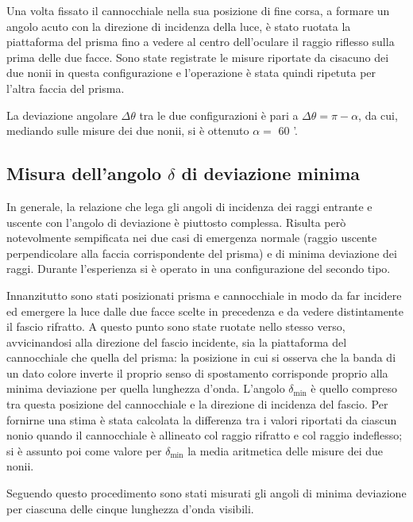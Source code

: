 \documentclass[italian,a4paper]{article}
\begin{document}
Una volta fissato il cannocchiale nella sua posizione di fine corsa, a formare un angolo acuto con la direzione di incidenza della luce, è stato ruotata la piattaforma del prisma fino a vedere al centro dell'oculare il raggio riflesso sulla prima delle due facce. Sono state registrate le misure riportate da cisacuno dei due nonii in questa configurazione e l'operazione è stata quindi ripetuta per l'altra faccia del prisma.

La deviazione angolare $\Delta \theta$ tra le due configurazioni è pari a $\Delta\theta=\pi-\alpha$, da cui, mediando sulle misure dei due nonii, si è ottenuto $\alpha=$ 60 '.
\subsection*{Misura dell'angolo $\delta$ di deviazione minima}
In generale, la relazione che lega gli angoli di incidenza dei raggi entrante e uscente con l'angolo di deviazione è piuttosto complessa. Risulta però notevolmente sempificata nei due casi di emergenza normale (raggio uscente perpendicolare alla faccia corrispondente del prisma) e di minima deviazione dei raggi. Durante l'esperienza si è operato in una configurazione del secondo tipo.

Innanzitutto sono stati posizionati prisma e cannocchiale in modo da far incidere ed emergere la luce dalle due facce scelte in precedenza e da vedere distintamente il fascio rifratto. A questo punto sono state ruotate nello stesso verso, avvicinandosi alla direzione del fascio incidente, sia la piattaforma del cannocchiale che quella del prisma: la posizione in cui si osserva che la banda di un dato colore inverte il proprio senso di spostamento corrisponde proprio alla minima deviazione per quella lunghezza d'onda. L'angolo $\delta_{\min}$ è quello compreso tra questa posizione del cannocchiale e la direzione di incidenza del fascio. Per fornirne una stima è stata calcolata la differenza tra i valori riportati da ciascun nonio quando il cannocchiale è allineato col raggio rifratto e col raggio indeflesso; si è assunto poi come valore per $\delta_{\min}$ la media aritmetica delle misure dei due nonii.

Seguendo questo procedimento sono stati misurati gli angoli di minima deviazione per ciascuna delle cinque lunghezza d'onda visibili.
\end{document}
